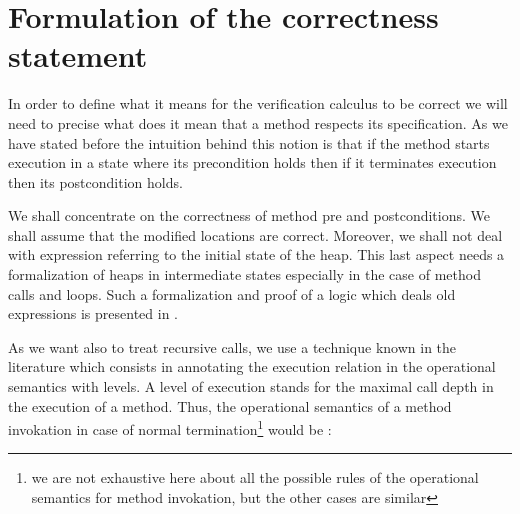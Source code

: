 \newtheorem{defCorrect}{Definition}[section]
\newtheorem{vcGenCorrect}{Theorem}[section]

\section{Formulation of the correctness statement}\label{proof:defineCorrect}

In order to define what it means for the verification calculus to be correct we will need to 
 precise what does it mean that a  method respects its specification. As we have stated 
 before the intuition behind this notion is that if the method starts execution in a state 
 where its precondition  holds then if it terminates execution then its postcondition holds.
   
 We shall concentrate on the correctness of method pre and postconditions. We shall assume that the modified locations are
 correct. Moreover, we shall not deal with expression referring to the initial state of the heap. This last aspect needs a
 formalization of heaps in intermediate states especially in the case of method calls and loops. Such a formalization and proof of a
logic which deals old expressions is presented in \cite{}. 

 As we want also to treat recursive calls, we use a technique  known in the literature \cite{Nipkow-MOD2001} which consists in  annotating the execution 
relation in  the operational semantics with levels. A level of execution  stands for  the maximal call depth in the execution of a  method. 
  Thus, the operational semantics of a method invokation in case of normal termination\footnote{we are not exhaustive here about all the possible rules of the 
operational semantics  for method invokation, but the other cases are similar}  would be :
 
